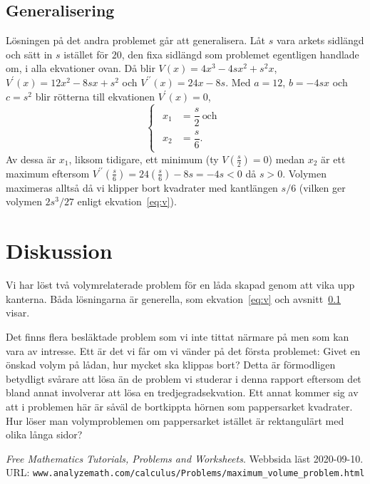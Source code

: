 \documentclass[a4paper,12pt]{article}
\begin{document}
\subsection{Generalisering} \label{sec:gen}

Lösningen på det andra problemet går att generalisera. Låt $s$ vara
arkets sidlängd och sätt in $s$ istället för $20$, den fixa 
sidlängd som problemet egentligen handlade om, i alla ekvationer
ovan. Då blir
  $V(x)                = 4x^3  - 4sx^2   + s^2x$,
  $V^\prime(x)         = 12x^2 - 8sx+s^2$ och
  $V^{\prime\prime}(x) = 24x   - 8s$.
Med $a = 12$, $b = -4sx$ och $c = s^2$ blir rötterna till
ekvationen $V^\prime(x) = 0$, 
%
\begin{displaymath}
  \begin{cases}
    \begin{aligned}
      x_1 &= \dfrac{s}{2} ~ \text{och}\\
      x_2 &= \dfrac{s}{6}.
    \end{aligned}
  \end{cases}
\end{displaymath}
%
Av dessa är $x_1$, liksom tidigare, ett minimum (ty $V(\frac{s}{2}) = 0$)
medan $x_2$ är ett maximum eftersom
  $V^{\prime\prime}(\frac{s}{6}) = 24(\frac{s}{6}) - 8s
                                 = -4s
				           < 0$
då $s > 0$. Volymen maximeras alltså då vi klipper bort kvadrater med
kantlängen $s / 6$ (vilken ger volymen $2s^3/27$ enligt
ekvation~\ref{eq:v}). 

\section{Diskussion}

Vi har löst två volymrelaterade problem för en låda skapad genom att
vika upp kanterna. Båda lösningarna är generella, som
ekvation~\ref{eq:v} och avsnitt~\ref{sec:gen} visar. 

Det finns flera besläktade problem som vi inte tittat närmare på men
som kan vara av intresse. Ett är det vi får om vi vänder på det första
problemet: Givet en önskad volym på lådan, hur mycket ska klippas
bort? Detta är förmodligen betydligt svårare att lösa än de problem vi
studerar i denna rapport eftersom det bland annat involverar att lösa
en tredjegradsekvation. Ett annat kommer sig av att i problemen här är
såväl de bortkippta hörnen som pappersarket kvadrater. Hur löser man
volymproblemen om pappersarket istället är rektangulärt med olika
långa sidor?  

\begin{thebibliography}{99}
   \emph{Free Mathematics Tutorials, Problems and
    Worksheets}. Webbsida läst 2020-09-10. URL: 
  \texttt{www.analyzemath.com/calculus/Problems/maximum\_volume\_problem.html}
\end{thebibliography}
\end{document}
